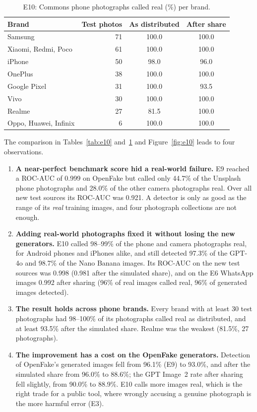 \documentclass{mnnit}
\begin{document}
\begin{table}[htbp]
\centering
\caption{E10: Commons phone photographs called real (\%) per brand.}
\label{tab:e10-brands}
\small
\begin{tabular}{lrcc}
\toprule
\textbf{Brand} & \textbf{Test photos} & \textbf{As distributed} & \textbf{After share}\\
\midrule
Samsung & 71 & 100.0 & 100.0\\
Xiaomi, Redmi, Poco & 61 & 100.0 & 100.0\\
iPhone & 50 & 98.0 & 96.0\\
OnePlus & 38 & 100.0 & 100.0\\
Google Pixel & 31 & 100.0 & 93.5\\
Vivo & 30 & 100.0 & 100.0\\
Realme & 27 & 81.5 & 100.0\\
Oppo, Huawei, Infinix & 6 & 100.0 & 100.0\\
\bottomrule
\end{tabular}
\end{table}

The comparison in Tables~\ref{tab:e10} and~\ref{tab:e10-brands} and
Figure~\ref{fig:e10} leads to four observations.

\begin{enumerate}
  \item \textbf{A near-perfect benchmark score hid a real-world failure.}
        E9 reached a \mbox{ROC-AUC} of 0.999 on OpenFake but called only 44.7\%
        of the Unsplash phone photographs and 28.0\% of the other camera
        photographs real. Over all new test sources its \mbox{ROC-AUC} was
        0.921. A detector is only as good as the range of its
        \emph{real} training images, and four photograph collections are
        not enough.
  \item \textbf{Adding real-world photographs fixed it without losing
        the new generators.} E10 called 98--99\% of the phone and camera
        photographs real, for Android phones and iPhones alike, and still
        detected 97.3\% of the GPT-4o and 98.7\% of the Nano Banana
        images. Its \mbox{ROC-AUC} on the new test sources was 0.998 (0.981
        after the simulated share), and on the E6 WhatsApp images 0.992
        after sharing (96\% of real images called real, 96\% of
        generated images detected).
  \item \textbf{The result holds across phone brands.} Every brand with
        at least 30 test photographs had 98--100\% of its photographs
        called real as distributed, and at least 93.5\% after the
        simulated share. Realme was the weakest (81.5\%, 27 photographs).
  \item \textbf{The improvement has a cost on the OpenFake generators.}
        Detection of OpenFake's generated images fell from 96.1\% (E9) to
        93.0\%, and after the simulated share from 96.0\% to 88.6\%; the
        GPT Image~2 rate after sharing fell slightly, from 90.0\% to
        88.9\%. E10 calls more images real, which is the right trade for
        a public tool, where wrongly accusing a genuine photograph is the
        more harmful error (E3).
\end{enumerate}
\end{document}
